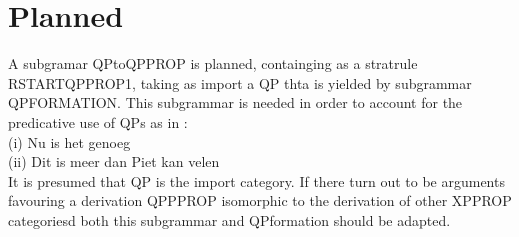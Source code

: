 \section{Planned}

A subgramar QPtoQPPROP is planned, containging as a stratrule 
RSTARTQPPROP1,  taking as import a QP thta is yielded by subgrammar 
QPFORMATION. 
This subgrammar is needed in order to account for the 
predicative use of QPs as in :\\

(i)  Nu is het genoeg\\
(ii) Dit is meer dan Piet kan velen \\


It is presumed that QP is the import category.
If there turn out to be arguments 
favouring a derivation  QPPPROP isomorphic to the derivation of other XPPROP 
categoriesd both this subgrammar and QPformation should be adapted.\\


